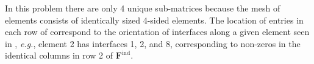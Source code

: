\noindent
In this problem there are only 4 unique sub-matrices because the mesh of elements consists of identically sized 4-sided elements. 
The location of entries in each row of  correspond to the orientation of interfaces along a given element seen in , \emph{e.g.}, element 2 has interfaces 1, 2, and 8, corresponding to non-zeros in the identical columns in row 2 of $\textbf{F}^{\text{ind}}$.

%
%
%
